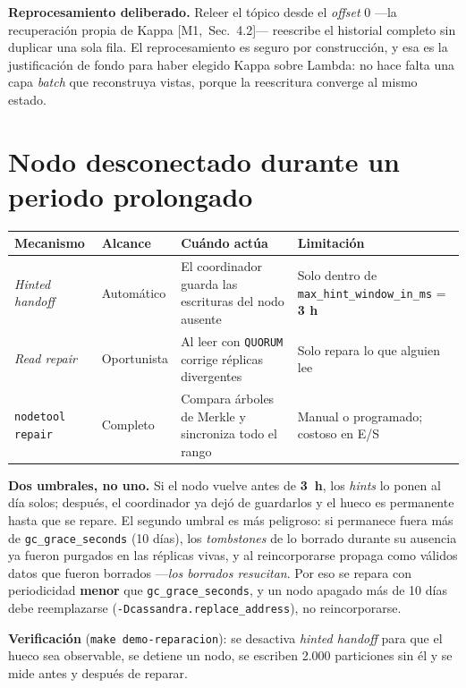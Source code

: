 \documentclass[11pt,a4paper]{article}
\newcommand{\mI}[1]{\textcolor{acento}{\small[M1,~Sec.~#1]}}
\begin{document}
\smallskip
\noindent\textbf{Reprocesamiento deliberado.} Releer el tópico desde el
\emph{offset} 0 —la recuperación propia de Kappa \mI{4.2}— reescribe el historial
completo sin duplicar una sola fila. El reprocesamiento es seguro por construcción,
y esa es la justificación de fondo para haber elegido Kappa sobre Lambda: no hace
falta una capa \emph{batch} que reconstruya vistas, porque la reescritura converge
al mismo estado.

\section{Nodo desconectado durante un periodo prolongado}
\begin{center}\small
\begin{tabular}{@{}p{2.7cm}p{2.2cm}p{4.3cm}p{4.9cm}@{}}
\toprule
\textbf{Mecanismo} & \textbf{Alcance} & \textbf{Cuándo actúa} & \textbf{Limitación} \\
\midrule
\emph{Hinted handoff} & Automático & El coordinador guarda las escrituras del nodo ausente & Solo dentro de \texttt{max\_hint\_window\_in\_ms} = \textbf{3 h} \\
\addlinespace
\emph{Read repair} & Oportunista & Al leer con \texttt{QUORUM} corrige réplicas divergentes & Solo repara lo que alguien lee \\
\addlinespace
\texttt{nodetool repair} & Completo & Compara árboles de Merkle y sincroniza todo el rango & Manual o programado; costoso en E/S \\
\bottomrule
\end{tabular}
\end{center}

\noindent\textbf{Dos umbrales, no uno.} Si el nodo vuelve antes de \textbf{3~h}, los
\emph{hints} lo ponen al día solos; después, el coordinador ya dejó de guardarlos y
el hueco es permanente hasta que se repare. El segundo umbral es más peligroso: si
permanece fuera más de \texttt{gc\_grace\_seconds} (10 días), los \emph{tombstones}
de lo borrado durante su ausencia ya fueron purgados en las réplicas vivas, y al
reincorporarse propaga como válidos datos que fueron borrados —\emph{los borrados
resucitan}. Por eso se repara con periodicidad \textbf{menor} que
\texttt{gc\_grace\_seconds}, y un nodo apagado más de 10 días debe reemplazarse
(\texttt{-Dcassandra.replace\_address}), no reincorporarse.

\smallskip
\noindent\textbf{Verificación} (\texttt{make demo-reparacion}): se desactiva
\emph{hinted handoff} para que el hueco sea observable, se detiene un nodo, se
escriben 2.000 particiones sin él y se mide antes y después de reparar.
\end{document}
